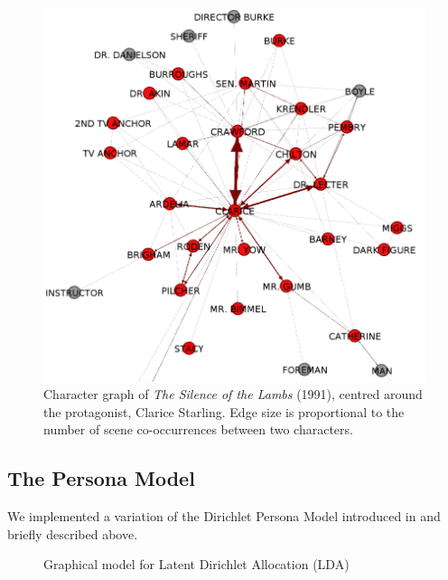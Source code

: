 \documentclass[bsc,frontabs,singlespacing,parskip]{infthesis} %
\begin{document}
\begin{figure}
	\centering
	\includegraphics[scale=0.4]{clarice_graph}
	\caption{Character graph of \textit{The Silence of the Lambs} (1991), centred around the protagonist, Clarice Starling. Edge size is proportional to the number of scene co-occurrences between two characters.}
\end{figure}

\subsection{The Persona Model}
We implemented a variation of the Dirichlet Persona Model introduced in \cite{Bamman2013} and briefly described above.

\begin{figure}[h!]
\centering
{}
\caption{Graphical model for Latent Dirichlet Allocation (LDA)}
\label{fig:lda}
\end{figure}
\end{document}
